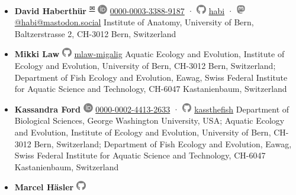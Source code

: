 \begin{itemize}
\item
  \textbf{David Haberthür}
  \textsuperscript{\protect\hyperlink{correspondence}{✉}}
  \includegraphics[width=0.16667in,height=0.16667in]{images/orcid.svg}
  \href{https://orcid.org/0000-0003-3388-9187}{0000-0003-3388-9187} ·
  \includegraphics[width=0.16667in,height=0.16667in]{images/github.svg}
  \href{https://github.com/habi}{habi}
  · \includegraphics[width=0.16667in,height=0.16667in]{images/mastodon.svg}
  \href{https://mastodon.social/@habi}{@habi@mastodon.social}
  Institute of Anatomy, University of Bern, Baltzerstrasse 2, CH-3012 Bern, Switzerland
\item
  \textbf{Mikki Law}
  \includegraphics[width=0.16667in,height=0.16667in]{images/github.svg}
  \href{https://github.com/mlaw-migalig}{mlaw-migalig}
  Aquatic Ecology and Evolution, Institute of Ecology and Evolution, University of Bern, CH-3012 Bern, Switzerland; Department of Fish Ecology and Evolution, Eawag, Swiss Federal Institute for Aquatic Science and Technology, CH-6047 Kastanienbaum, Switzerland
\item
  \textbf{Kassandra Ford}
  \includegraphics[width=0.16667in,height=0.16667in]{images/orcid.svg}
  \href{https://orcid.org/0000-0002-4413-2633}{0000-0002-4413-2633} ·
  \includegraphics[width=0.16667in,height=0.16667in]{images/github.svg}
  \href{https://github.com/kassthefish}{kassthefish}
  Department of Biological Sciences, George Washington University, USA; Aquatic Ecology and Evolution, Institute of Ecology and Evolution, University of Bern, CH-3012 Bern, Switzerland; Department of Fish Ecology and Evolution, Eawag, Swiss Federal Institute for Aquatic Science and Technology, CH-6047 Kastanienbaum, Switzerland
\item
  \textbf{Marcel Häsler}
  \includegraphics[width=0.16667in,height=0.16667in]{images/github.svg}

\end{itemize}

